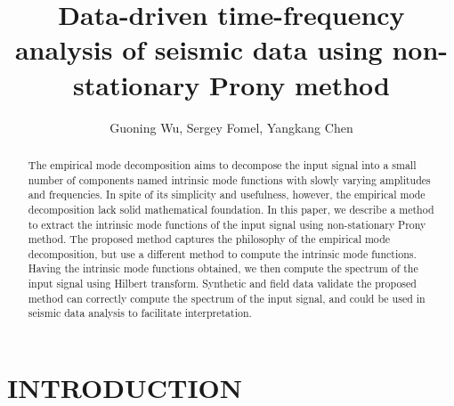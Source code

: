 
\title{Data-driven time-frequency analysis of seismic data using 
non-stationary Prony method} 
\renewcommand{\thefootnote}{\fnsymbol{footnote}}
\address{
\footnotemark[1] The College of Science\\
China University of Petroleum\\
Beijing, China
\footnotemark[2] Bureau of Economic Geology,\\
John A. and Katherine G. Jackson School of Geosciences\\
The University of Texas at Austin\\
University Station, Box X\\
Austin, TX, USA, 78731-8924\\
\footnotemark[3]  Oak Ridge National Laboratory
}

\author{Guoning Wu\footnotemark[1], Sergey Fomel\footnotemark[2], Yangkang Chen\footnotemark[3]}

\maketitle

\begin{abstract}
The empirical mode decomposition aims to decompose the input signal 
into a small number of components named intrinsic mode functions 
with slowly varying amplitudes and frequencies. In spite of its simplicity
and usefulness, however, the empirical mode decomposition lack 
solid mathematical foundation. In this paper, we describe a method to 
extract the intrinsic mode functions of the input signal using 
non-stationary Prony method. The proposed method captures the 
philosophy of the empirical mode decomposition, but use a different 
method to compute the intrinsic mode functions. 
Having the intrinsic mode functions obtained, we then compute 
the spectrum of the input signal using Hilbert transform. Synthetic and field data 
validate the proposed method can correctly compute the 
spectrum of the input signal, and could be used in seismic data analysis to facilitate 
interpretation.
\end{abstract}

\section{INTRODUCTION}

